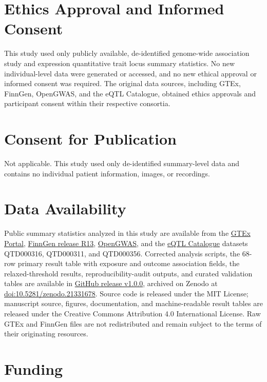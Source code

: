 \section*{Ethics Approval and Informed Consent}

This study used only publicly available, de-identified genome-wide association study and expression quantitative trait locus summary statistics. No new individual-level data were generated or accessed, and no new ethical approval or informed consent was required. The original data sources, including GTEx, FinnGen, OpenGWAS, and the eQTL Catalogue, obtained ethics approvals and participant consent within their respective consortia.

\section*{Consent for Publication}

Not applicable. This study used only de-identified summary-level data and contains no individual patient information, images, or recordings.

\section*{Data Availability}

Public summary statistics analyzed in this study are available from the \href{https://gtexportal.org/home/}{GTEx Portal}, \href{https://r13.finngen.fi/}{FinnGen release R13}, \href{https://gwas.mrcieu.ac.uk/}{OpenGWAS}, and the \href{https://www.ebi.ac.uk/eqtl/}{eQTL Catalogue} datasets QTD000316, QTD000311, and QTD000356. Corrected analysis scripts, the 68-row primary result table with exposure and outcome association fields, the relaxed-threshold results, reproducibility-audit outputs, and curated validation tables are available in \href{https://github.com/muhaoyang0616/skin_drug_target_mr/releases/tag/v1.0.0}{GitHub release v1.0.0}, archived on Zenodo at \href{https://doi.org/10.5281/zenodo.21331678}{doi:10.5281/zenodo.21331678}. Source code is released under the MIT License; manuscript source, figures, documentation, and machine-readable result tables are released under the Creative Commons Attribution 4.0 International License. Raw GTEx and FinnGen files are not redistributed and remain subject to the terms of their originating resources.

\section*{Funding}

